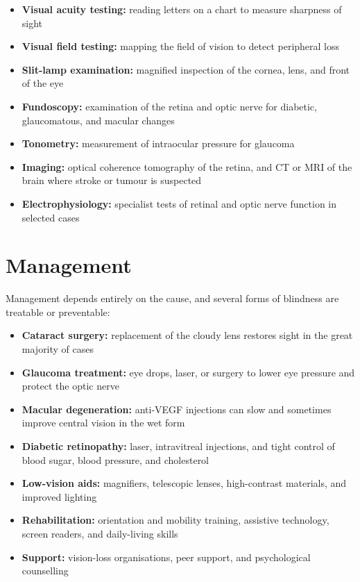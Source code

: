 \begin{itemize}
    \item \textbf{Visual acuity testing:} reading letters on a chart to measure sharpness of sight
    \item \textbf{Visual field testing:} mapping the field of vision to detect peripheral loss
    \item \textbf{Slit-lamp examination:} magnified inspection of the cornea, lens, and front of the eye
    \item \textbf{Fundoscopy:} examination of the retina and optic nerve for diabetic, glaucomatous, and macular changes
    \item \textbf{Tonometry:} measurement of intraocular pressure for glaucoma
    \item \textbf{Imaging:} optical coherence tomography of the retina, and CT or MRI of the brain where stroke or tumour is suspected
    \item \textbf{Electrophysiology:} specialist tests of retinal and optic nerve function in selected cases
\end{itemize}

\section*{Management}
Management depends entirely on the cause, and several forms of blindness are treatable or preventable:

\begin{itemize}
    \item \textbf{Cataract surgery:} replacement of the cloudy lens restores sight in the great majority of cases
    \item \textbf{Glaucoma treatment:} eye drops, laser, or surgery to lower eye pressure and protect the optic nerve
    \item \textbf{Macular degeneration:} anti-VEGF injections can slow and sometimes improve central vision in the wet form
    \item \textbf{Diabetic retinopathy:} laser, intravitreal injections, and tight control of blood sugar, blood pressure, and cholesterol
    \item \textbf{Low-vision aids:} magnifiers, telescopic lenses, high-contrast materials, and improved lighting
    \item \textbf{Rehabilitation:} orientation and mobility training, assistive technology, screen readers, and daily-living skills
    \item \textbf{Support:} vision-loss organisations, peer support, and psychological counselling
\end{itemize}

